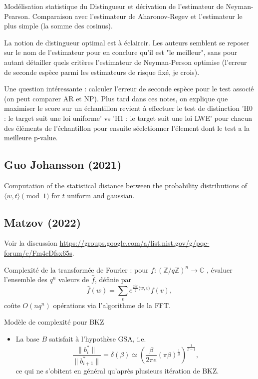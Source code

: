 \documentclass{article}
\begin{document}
Modélisation statistique du Distingueur et dérivation de l'estimateur de Neyman-Pearson. Comparaison avec l'estimateur de Aharonov-Regev et l'estimateur le plus simple (la somme des cosinus). 

La notion de distingueur optimal est à éclaircir. Les auteurs semblent se reposer sur le nom de l'estimateur pour en conclure qu'il est "le meilleur", sans pour autant détailler quels critères l'estimateur de Neyman-Person optimise (l'erreur de seconde espèce parmi les estimateurs de risque fixé, je crois).

Une question intéressante : calculer l'erreur de seconde espèce pour le test associé (on peut comparer AR et NP). Plus tard dans ces notes, on explique que maximiser le score sur un échantillon revient à effectuer le test de distinction 'H0 : le target suit une loi uniforme' vs 'H1 : le target suit une loi LWE' pour chacun des éléments de l'échantillon pour ensuite séelctionner l'élement dont le test a la meilleure p-value.

\subsection{Guo Johansson (2021)}

Computation of the statistical distance between the probability distributions of $\langle w , t \rangle \pmod{1}$ for $t$ uniform and gaussian.  

\subsection{Matzov (2022)} %

Voir la discussion \url{https://groups.google.com/a/list.nist.gov/g/pqc-forum/c/Fm4cDfsx65s}.

Complexité de la transformée de Fourier : pour $f : (\mathbb Z/q\mathbb Z )^n \rightarrow \mathbb C $ , évaluer l'ensemble des $q^n$ valeurs de $\hat f$, définie par  
\[\hat f (w) = \sum_{v} e^{\frac{2i\pi}{q}\langle w,v\rangle } f(v),\]
coûte $O(nq^n)$ opérations via l'algorithme de la FFT.

Modèle de complexité pour BKZ
\begin{itemize} 
\item La base $B$ satisfait à l'hypothèse GSA, i.e.
\[\frac{ \|b_{i}^*\| }{\|b_{i+1}^*\|} = \delta(\beta) \simeq (\frac{\beta}{2\pi e}(\pi\beta)^{\frac{1}{\beta}} )^{\frac{1}{\beta-1}},\]
ce qui ne s'obitent en général qu'après plusieurs itération de BKZ.
\end{itemize}
\end{document}
